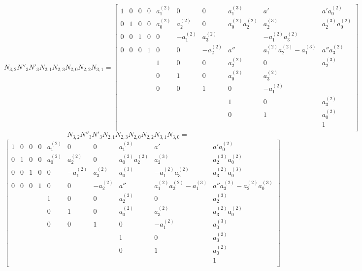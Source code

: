 \documentclass{article}
\begin{document}
\[
N_{3,2}N''_3N'_3N_{2,1}N_{2,3}N_{2,0}N_{2,2}N_{3,1}=
  \begin{bmatrix}
    1 & 0 & 0 & 0 & a_1^{(2)} & 0 & 0 & a_1^{(3)} & a' & a'a_0^{(2)} \\
    0 & 1 & 0 & 0 & a_0^{(2)} & a_2^{(2)} & 0 & a_0^{(2)}a_2^{(2)} & a_2^{(3)} & a_2^{(3)}a_0^{(2)} \\
    0 & 0 & 1 & 0 & 0 & -a_1^{(2)} & a_3^{(2)} &  & -a_1^{(2)}a_3^{(2)} &  \\
    0 & 0 & 0 & 1 & 0 & 0 & -a_2^{(2)} & a'' & a_1^{(2)}a_2^{(2)}-a_1^{(3)} & a''a_3^{(2)} \\
    & & & & 1 & 0 & 0 & a_2^{(2)} & 0 & a_2^{(3)} \\
    & & & & 0 & 1 & 0 & a_0^{(2)} & a_3^{(2)} & \\
    & & & & 0 & 0 & 1 & 0 & -a_1^{(2)} &  \\
    & & & & & & & 1 & 0 & a_3^{(2)} \\
    & & & & & & & 0 & 1 & a_0^{(2)} \\
    & & & & & & & & & 1 \\
  \end{bmatrix}
\]
\newpage
\[
N_{3,2}N''_3N'_3N_{2,1}N_{2,3}N_{2,0}N_{2,2}N_{3,1}N_{3,0}=\]\[
  \begin{bmatrix}
    1 & 0 & 0 & 0 & a_1^{(2)} & 0 & 0 & a_1^{(3)} & a' & a'a_0^{(2)} \\
    0 & 1 & 0 & 0 & a_0^{(2)} & a_2^{(2)} & 0 & a_0^{(2)}a_2^{(2)} & a_2^{(3)} & a_2^{(3)}a_0^{(2)} \\
    0 & 0 & 1 & 0 & 0 & -a_1^{(2)} & a_3^{(2)} & a_0^{(3)} & -a_1^{(2)}a_3^{(2)} & a_3^{(2)}a_0^{(3)} \\
    0 & 0 & 0 & 1 & 0 & 0 & -a_2^{(2)} & a'' & a_1^{(2)}a_2^{(2)}-a_1^{(3)} & a''a_3^{(2)}-a_2^{(2)}a_0^{(3)} \\
    & & & & 1 & 0 & 0 & a_2^{(2)} & 0 & a_2^{(3)} \\
    & & & & 0 & 1 & 0 & a_0^{(2)} & a_3^{(2)} & a_3^{(2)}a_0^{(2)}\\
    & & & & 0 & 0 & 1 & 0 & -a_1^{(2)} & a_0^{(3)} \\
    & & & & & & & 1 & 0 & a_3^{(2)} \\
    & & & & & & & 0 & 1 & a_0^{(2)} \\
    & & & & & & & & & 1 \\
  \end{bmatrix}
\]
\end{document}

